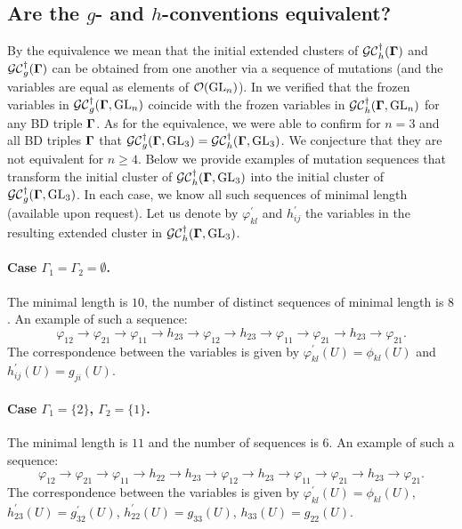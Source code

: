 \subsection{Are the $g$- and $h$-conventions equivalent?}\label{s:ghequiv}
By the equivalence we mean that the initial extended clusters of $\mathcal{GC}_h^{\dagger}(\mathbf{\Gamma})$ and $\mathcal{GC}_g^{\dagger}(\mathbf{\Gamma})$ can be obtained from one another via a sequence of mutations (and the variables are equal as elements of $\mathcal{O}(\operatorname{GL}_n)$). In \cite{multdual} we verified that the frozen variables in $\mathcal{GC}_g^{\dagger}(\mathbf{\Gamma},\operatorname{GL}_n)$ coincide with the frozen variables in $\mathcal{GC}_h^{\dagger}(\mathbf{\Gamma},\operatorname{GL}_n)$ for any BD triple $\mathbf{\Gamma}$. As for the equivalence, we were able to confirm for $n=3$ and all BD triples $\mathbf{\Gamma}$ that $\mathcal{GC}_{g}^{\dagger}(\mathbf{\Gamma},\operatorname{GL}_3) = \mathcal{GC}_{h}^{\dagger}(\mathbf{\Gamma},\operatorname{GL}_3)$. We conjecture that they are not equivalent for $n \geq 4$. Below we provide examples of mutation sequences that transform the initial cluster of $\mathcal{GC}_h^{\dagger}(\mathbf{\Gamma},\operatorname{GL}_3)$ into the initial cluster of $\mathcal{GC}_g^{\dagger}(\mathbf{\Gamma},\operatorname{GL}_3)$. In each case, we know all such sequences of minimal length (available upon request). Let us denote by $\varphi_{kl}^{\prime}$ and $h_{ij}^{\prime}$ the variables in the resulting extended cluster in $\mathcal{GC}^{\dagger}_h(\mathbf{\Gamma},\operatorname{GL}_3)$.

\paragraph{Case $\Gamma_1=\Gamma_2=\emptyset$.} The minimal length is $10$, the number of distinct sequences of minimal length is $8$. An example of such a sequence:
\begin{equation}
    \varphi_{12}\rightarrow\varphi_{21} \rightarrow \varphi_{11}\rightarrow h_{23} \rightarrow \varphi_{12} \rightarrow h_{23} \rightarrow \varphi_{11} \rightarrow \varphi_{21} \rightarrow h_{23} \rightarrow \varphi_{21}.
\end{equation}
The correspondence between the variables is given by $\varphi_{kl}^{\prime}(U) = \phi_{kl}(U)$ and $h_{ij}^{\prime}(U) = g_{ji}(U)$.

\paragraph{Case $\Gamma_1 = \{2\}$, $\Gamma_2 = \{1\}$.} The minimal length is $11$ and the number of sequences is $6$. An example of such a sequence:
\begin{equation}
\varphi_{12}\rightarrow \varphi_{21} \rightarrow \varphi_{11} \rightarrow h_{22}\rightarrow h_{23}\rightarrow \varphi_{12} \rightarrow h_{23} \rightarrow \varphi_{11}\rightarrow \varphi_{21}\rightarrow h_{23} \rightarrow \varphi_{21}.
\end{equation}
The correspondence between the variables is given by $\varphi_{kl}^{\prime}(U) = \phi_{kl}(U)$, $h_{23}^{\prime}(U) = g_{32}^{\prime}(U)$, $h_{22}^{\prime}(U) = g_{33}(U)$, $h_{33}(U) = g_{22}(U)$.

